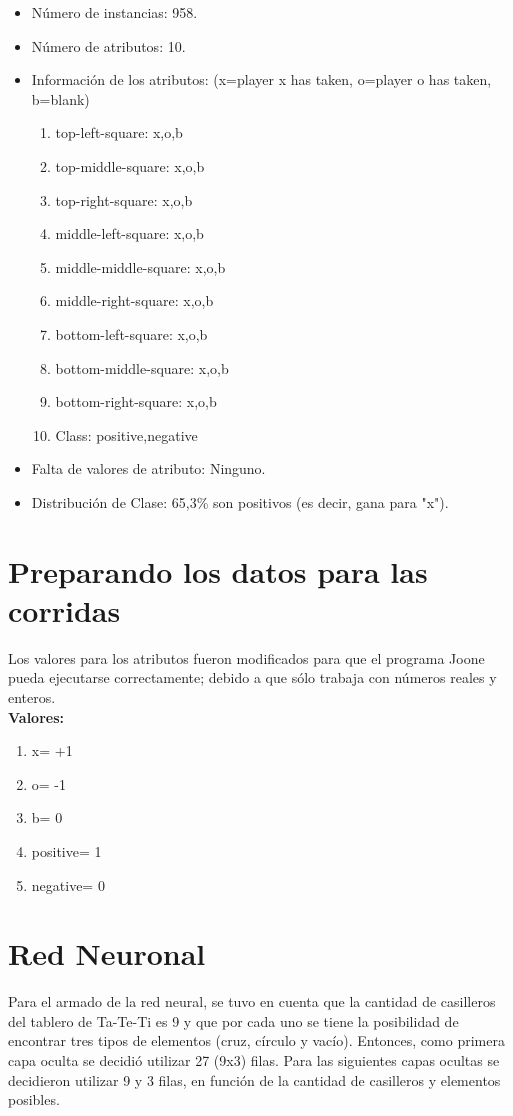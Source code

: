 \documentclass[12pt,titlepage]{article}
\begin{document}
\begin{itemize}
 \item N\'umero de instancias: 958.
 \item N\'umero de atributos: 10.
 \item Informaci\'on de los atributos: (x=player x has taken, o=player o has taken, b=blank)
    \begin{enumerate}
      \item top-left-square: {x,o,b}
      \item top-middle-square: {x,o,b}
      \item top-right-square: {x,o,b}
      \item middle-left-square: {x,o,b}
      \item middle-middle-square: {x,o,b}
      \item middle-right-square: {x,o,b}
      \item bottom-left-square: {x,o,b}
      \item bottom-middle-square: {x,o,b}
      \item bottom-right-square: {x,o,b}
      \item Class: {positive,negative}
    \end{enumerate}
 \item Falta de valores de atributo: Ninguno.
 \item Distribución de Clase: 65,3\% son positivos (es decir, gana para "x").
\end{itemize}

\section{Preparando los datos para las corridas}
Los valores para los atributos fueron modificados para que el programa Joone pueda ejecutarse correctamente;
debido a que s\'olo trabaja con n\'umeros reales y enteros. \\
{\bf{Valores:}}
    \begin{enumerate}
      \item x= +1
      \item o= -1
      \item b= 0
      \item positive= 1
      \item negative= 0
    \end{enumerate}

\section{Red Neuronal}
Para el armado de la red neural, se tuvo en cuenta que la cantidad de casilleros del tablero de Ta-Te-Ti es 9 y que por cada uno se tiene la posibilidad de encontrar tres tipos de elementos (cruz, c\'irculo y vac\'io). Entonces, como primera capa oculta se decidi\'o utilizar 27 (9x3) filas. Para las siguientes capas ocultas se decidieron utilizar 9 y 3 filas, en funci\'on de la cantidad de casilleros y elementos posibles. \\
\end{document}
